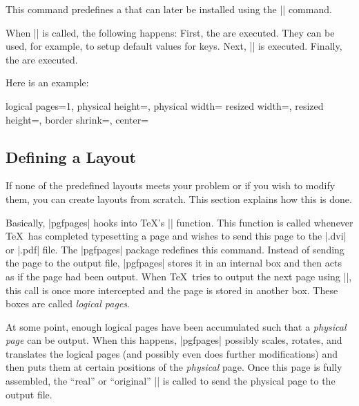 \begin{command}{\pgfpagesdeclarelayout{}}
  This command predefines a  that can later be installed
  using the |\pgfpagesuselayout| command.

  When |\pgfpagesuselayout| is called, the
  following happens: First, the  are
  executed. They can be used, for example, to setup default values for
  keys. Next, || is
  executed. Finally, the  are executed.

  Here is an example:
\begin{codeexample}
{
  \def\pgfpageoptionborder{0pt}
}
{
  \pgfpagesphysicalpageoptions
  {%
    logical pages=1,%
    physical height=\pgfpageoptionheight,%
    physical width=\pgfpageoptionwidth%
  }
  {%
    resized width=\pgfphysicalwidth,%
    resized height=\pgfphysicalheight,%
    border shrink=\pgfpageoptionborder,%
    center=\pgfpoint{.5\pgfphysicalwidth}{.5\pgfphysicalheight}%
  }%
}
\end{codeexample}
\end{command}




\subsection{Defining a Layout}

If none of the predefined layouts meets your problem or if you wish to
modify them, you can create layouts from scratch. This section
explains how this is done.

Basically, |pgfpages| hooks into \TeX's |\shipout| function. This
function is called whenever \TeX\ has completed typesetting a page and
wishes to send this page to the |.dvi| or |.pdf| file. The |pgfpages|
package redefines this command. Instead of sending the page to the output
file, |pgfpages| stores it in an internal box and then acts as if the
page had been output. When \TeX\ tries to output the next page using
|\shipout|, this call is once more intercepted and the page is stored
in another box. These boxes are called \emph{logical pages}.

At some point, enough logical pages have been accumulated such that a
\emph{physical page} can be output. When this happens, |pgfpages|
possibly scales, rotates, and translates the logical pages (and
possibly even does further modifications) and then puts them at
certain positions of the \emph{physical} page. Once this page is fully
assembled, the ``real'' or ``original'' |\shipout| is called to
send the physical page to the output file.

